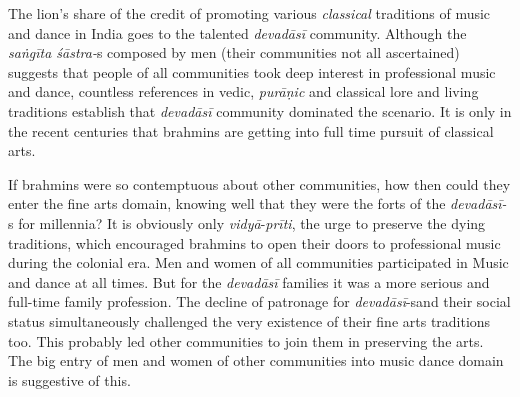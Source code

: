 The lion’s share of the credit of promoting various \textit{classical} traditions of music and dance in India goes to the talented \textit{devadāsī} community. Although the \textit{saṅgīta śāstra-}s composed by men (their communities not all ascertained) suggests that people of all communities took deep interest in professional music and dance, countless references in vedic, \textit{purāṇic} and classical lore and living traditions establish that \textit{devadāsī} community dominated the scenario. It is only in the recent centuries that brahmins are getting into full time pursuit of classical arts.

If brahmins were so contemptuous about other communities, how then could they enter the fine arts domain, knowing well that they were the forts of the \textit{devadāsī-}s for millennia? It is obviously only \textit{vidyā}-\textit{prīti}, the urge to preserve the dying traditions, which encouraged brahmins to open their doors to professional music during the colonial era. Men and women of all communities participated in Music and dance at all times. But for the \textit{devadāsī} families it was a more serious and full-time family profession. The decline of patronage for \textit{devadāsī}-s\break and their social status simultaneously challenged the very existence of their fine arts traditions too. This probably led other communities to join them in preserving the arts. The big entry of men and women of other communities into music dance domain is suggestive of this.

